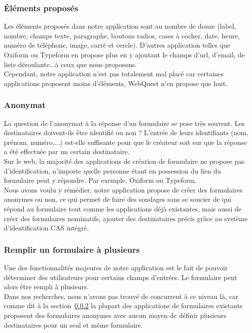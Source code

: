 \documentclass{sigplanconf}
\begin{document}
\subsubsection{Éléments proposés}
Les éléments proposés dans notre application sont au nombre de douze (label, nombre, champs texte, paragraphe, boutons radios, cases à cocher, date, heure, numéro de téléphone, image, carré et cercle). D’autres application telles que Oxiform\cite{urlOxiForm} ou Typeform\cite{urlTypeForm} en propose plus en y ajoutant le champs d’url, d’email, de liste déroulante...à ceux que nous proposons.\\ Cependant, notre application n’est pas totalement mal placé car certaines applications proposent moins d’éléments, WebQuest n’en propose que huit.
\subsubsection{Anonymat}\label{sec:anonymat}
La question de l’anonymat à la réponse d’un formulaire se pose très souvent. Les destinataires doivent-ils être identifié ou non ? L’entrée de leurs identifiants (nom, prénom, numéro,...) est-elle suffisante pour que le créateur soit sur que la réponse a été effectuée par un certain destinataire.\\
Sur le web, la majorité des applications de création de formulaire ne propose pas d’identification, n’importe quelle personne étant en possession du lien du formulaire peut y répondre. Par exemple, Oxiform ou Typeform. \\
Nous avons voulu y rémédier, notre application propose de créer des formulaires anonymes ou non, ce qui permet de faire des sondages sans se soucier de qui répond au formulaire tout comme les applications déjà existantes, mais aussi de créer des formulaires nominatifs, ajouter des destinataires précis grâce au système d’identification CAS intégré.
\subsubsection{Remplir un formulaire à plusieurs}
Une des fonctionnalités majeures de notre application est le fait de pouvoir déterminer des utilisateurs pour certains champs d'entrées. Le formulaire peut alors être rempli à plusieurs.\\
Dans nos recherches, nous n'avons pas trouvé de concurrent à ce niveau là, car comme dit à la section~\ref{sec:anonymat} la plupart des applications de formulaires existants proposent des formulaires anonymes avec aucun moyen de définir plusieurs destinataires pour un seul et même formulaire.
\end{document}
